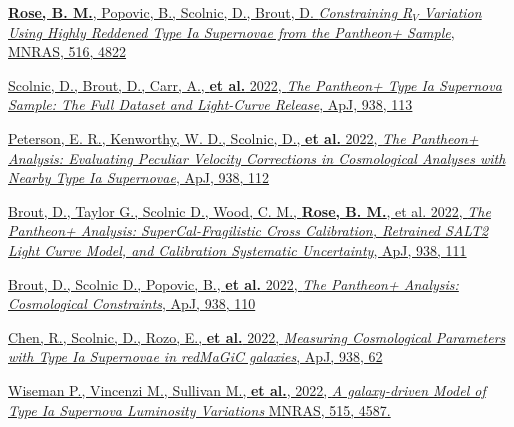 \documentclass[margin]{res}
\begin{document}
\begin{resume}
\hangindent=15pt 
\href{https://ui.adsabs.harvard.edu/abs/2022MNRAS.tmp.2310R/abstract}{{\bf Rose, B. M.}, Popovic, B., Scolnic, D., Brout, D. {\sl Constraining R$_V$ Variation Using Highly Reddened Type Ia Supernovae from the Pantheon+ Sample}, MNRAS, 516, 4822}
\vspace{-12pt}

\hangindent=15pt 
\href{https://ui.adsabs.harvard.edu/abs/2021arXiv211203863S/abstract}{Scolnic, D., Brout, D., Carr, A., {\bf et al.} 2022, {\sl The Pantheon+ Type Ia Supernova Sample: The Full Dataset and Light-Curve Release}, ApJ, 938, 113}
\vspace{-12pt}

\hangindent=15pt 
\href{https://ui.adsabs.harvard.edu/abs/2021arXiv211003487P/abstract}{Peterson, E. R., Kenworthy, W. D.,  Scolnic, D., {\bf et al.} 2022, {\sl The Pantheon+ Analysis: Evaluating Peculiar Velocity Corrections in Cosmological Analyses with Nearby Type Ia Supernovae}, ApJ, 938, 112}
\vspace{-12pt}

\hangindent=15pt 
\href{https://ui.adsabs.harvard.edu/abs/2021arXiv211203864B/abstract}{Brout, D., Taylor G., Scolnic D., Wood, C. M., \textbf{Rose, B. M.}, et al. 2022, {\sl The Pantheon+ Analysis: SuperCal-Fragilistic Cross Calibration, Retrained SALT2 Light Curve Model, and Calibration Systematic Uncertainty}, ApJ, 938, 111} 
\vspace{-12pt}

\hangindent=15pt 
\href{https://ui.adsabs.harvard.edu/abs/2022arXiv220204077B/abstract}{Brout, D., Scolnic D., Popovic, B., \textbf{et al.} 2022, {\sl The Pantheon+ Analysis: Cosmological Constraints}, ApJ, 938, 110}
\vspace{-12pt}

\hangindent=15pt 
\href{https://ui.adsabs.harvard.edu/abs/2022arXiv220210480C/abstract}{Chen, R., Scolnic, D., Rozo, E., \textbf{et al.} 2022, {\sl Measuring Cosmological Parameters with Type Ia Supernovae in redMaGiC galaxies}, ApJ, 938, 62}
\vspace{-12pt}

\hangindent=15pt 
\href{https://ui.adsabs.harvard.edu/link_gateway/2022MNRAS.515.4587W/PUB_HTML}{Wiseman P., Vincenzi M., Sullivan M., \textbf{et al.}, 2022, {\sl A galaxy-driven Model of Type Ia Supernova Luminosity Variations} MNRAS, 515, 4587.}
\vspace{-12pt}


\end{resume}
\end{document}
